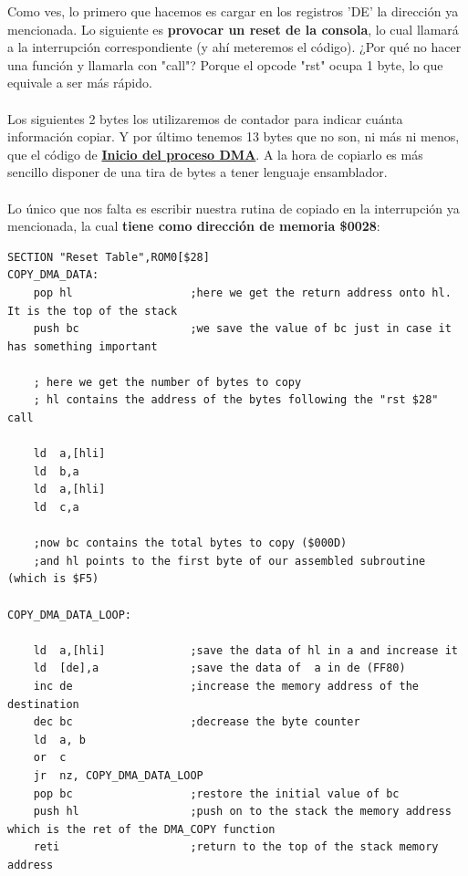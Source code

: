 Como ves, lo primero que hacemos es cargar en los registros 'DE' la dirección ya mencionada. Lo siguiente es \textbf{provocar un reset de la consola}, lo cual llamará a la interrupción correspondiente (y ahí meteremos el código). ¿Por qué no hacer una función y llamarla con "call"? Porque el opcode "rst" ocupa 1 byte, lo que equivale a ser más rápido.
\\ \\
Los siguientes 2 bytes los utilizaremos de contador para indicar cuánta información copiar. Y por último tenemos 13 bytes que no son, ni más ni menos, que el código de \textbf{\hyperref[code:dma_wait]{Inicio del proceso DMA}}. A la hora de copiarlo es más sencillo disponer de una tira de bytes a tener lenguaje ensamblador.
\\ \\
Lo único que nos falta es escribir nuestra rutina de copiado en la interrupción ya mencionada, la cual \textbf{tiene como dirección de memoria \$0028}:

\clearpage

\begin{lstlisting}[caption={Rutina de Copiado en Interrupción para DMA}, label={code:dma_copy2}]
SECTION "Reset Table",ROM0[$28]
COPY_DMA_DATA:
	pop hl 					;here we get the return address onto hl. It is the top of the stack
	push bc 				;we save the value of bc just in case it has something important

	; here we get the number of bytes to copy
  	; hl contains the address of the bytes following the "rst $28" call

	ld  a,[hli]
	ld  b,a
	ld  a,[hli]
	ld  c,a

	;now bc contains the total bytes to copy ($000D)
	;and hl points to the first byte of our assembled subroutine (which is $F5)

COPY_DMA_DATA_LOOP:

	ld  a,[hli] 			;save the data of hl in a and increase it
	ld  [de],a 		 		;save the data of  a in de (FF80)
	inc de 					;increase the memory address of the destination
	dec bc 					;decrease the byte counter
	ld  a, b 				
	or  c
	jr  nz, COPY_DMA_DATA_LOOP
	pop bc 					;restore the initial value of bc
	push hl 				;push on to the stack the memory address which is the ret of the DMA_COPY function
	reti					;return to the top of the stack memory address
\end{lstlisting}

